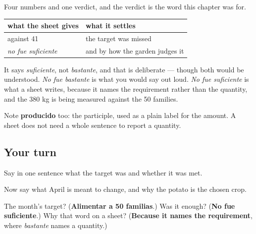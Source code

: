 \begin{grammarlens}[title={Grammar Lens: the sheet answers its own question}]
Four numbers and one verdict, and the verdict is the word this chapter was for.

\noindent
\begin{tabularx}{\linewidth}{@{}>{\raggedright\arraybackslash}X>{\raggedright\arraybackslash}X@{}}
\toprule
\textbf{what the sheet gives} & \textbf{what it settles} \\
\midrule
50 against 41 & the target was missed \\
\emph{no fue suficiente} & and by how the garden judges it \\
\bottomrule
\end{tabularx}

It says \emph{suficiente}, not \emph{bastante}, and that is deliberate — though both would be understood. \emph{No fue bastante} is what you would say out loud. \emph{No fue suficiente} is what a sheet writes, because it names the requirement rather than the quantity, and the 380 kg is being measured against the 50 families.

Note \textbf{producido} too: the participle, used as a plain label for the amount. A sheet does not need a whole sentence to report a quantity.
\end{grammarlens}

\subsection*{Your turn}
Say in one sentence what the target was and whether it was met.

Now say what April is meant to change, and why the potato is the chosen crop.

\begin{tcolorbox}[breakable,colback=teal!4,colframe=teal!35!black,title={Before you move on}]
The month's target? (\textbf{Alimentar a 50 familias}.) Was it enough? (\textbf{No fue suficiente}.) Why that word on a sheet? (\textbf{Because it names the requirement}, where \emph{bastante} names a quantity.)
\end{tcolorbox}
